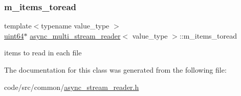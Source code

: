 \subsubsection{\texorpdfstring{m\+\_\+items\+\_\+toread}{m\_items\_toread}}
{\footnotesize\ttfamily template$<$typename value\+\_\+type $>$ \\
\hyperlink{types_8h_a60e8696a4678cd348e991a1f172e53f7}{uint64}$\ast$ \hyperlink{classasync__multi__stream__reader}{async\+\_\+multi\+\_\+stream\+\_\+reader}$<$ value\+\_\+type $>$\+::m\+\_\+items\+\_\+toread\hspace{0.3cm}{\ttfamily [private]}}



items to read in each file 



The documentation for this class was generated from the following file\+:\begin{DoxyCompactItemize}
\item 
code/src/common/\hyperlink{async__stream__reader_8h}{async\+\_\+stream\+\_\+reader.\+h}\end{DoxyCompactItemize}
